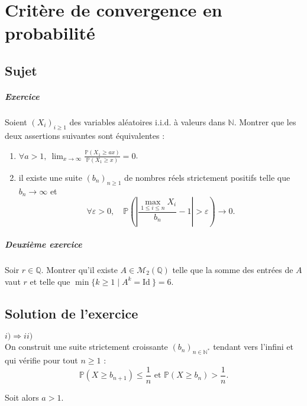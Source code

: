 \chapter{Critère de convergence en probabilité}

\section{Sujet}

\paragraph{Exercice}

Soient $(X_i)_{i\geqslant 1}$ des variables aléatoires i.i.d. à valeurs dans $\mathbb N$. Montrer que les deux assertions suivantes sont équivalentes :
\begin{enumerate}[label=(\arabic*)]
    \item $\displaystyle\forall a >1,\  \lim_{x\to\infty} \frac{\mathbb P(X_1 \geqslant ax)}{\mathbb P(X_1 \geqslant x)}=0$.
    \item il existe une suite $(b_n)_{n\geqslant 1}$ de nombres réels strictement positifs telle que $b_n \to \infty$ et
    \[
        \forall \varepsilon > 0,\quad \mathbb P\left(\left|\frac{\max_{1\leqslant i\leqslant n} X_i}{b_n} - 1 \right| > \varepsilon\right) \to 0.
    \]
\end{enumerate}

\paragraph{Deuxième exercice}
Soir $r \in \mathbb Q.$ Montrer qu'il existe $A \in \mathcal M_2(\mathbb Q)$ telle que la somme des entrées de $A$ vaut $r$ et telle que $\min \{k\geqslant 1 \mid A^k = \mathrm{Id}\: \} =6.$

\section{Solution de l'exercice} %

$\boxed{i)\Longrightarrow ii)}$\\

On construit une suite strictement croissante $\displaystyle (b_{n})_{n\in\mathbb{N}^{*}}$ tendant vers l'infini et qui vérifie pour tout $n\geq 1$ : $$\mathbb{P}(X\geq b_{n+1})\leq \frac{1}{n} \mbox{ et }\mathbb{P}(X\geq b_{n})>\frac{1}{n}.$$

Soit alors $a>1.$ 

